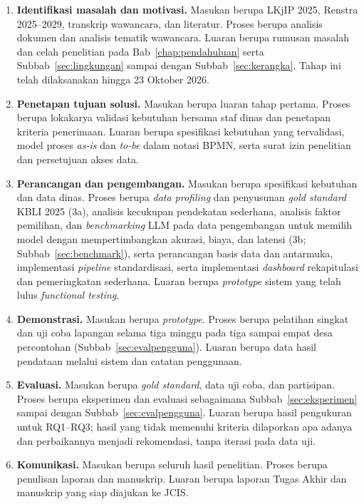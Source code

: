 \begin{enumerate}
  \item \textbf{Identifikasi masalah dan motivasi.} Masukan berupa LKjIP 2025, Renstra 2025--2029, transkrip wawancara, dan literatur. Proses berupa analisis dokumen dan analisis tematik wawancara. Luaran berupa rumusan masalah dan celah penelitian pada Bab~\ref{chap:pendahuluan} serta Subbab~\ref{sec:lingkungan} sampai dengan Subbab~\ref{sec:kerangka}. Tahap ini telah dilaksanakan hingga 23 Oktober 2026.
  \item \textbf{Penetapan tujuan solusi.} Masukan berupa luaran tahap pertama. Proses berupa lokakarya validasi kebutuhan bersama staf dinas dan penetapan kriteria penerimaan. Luaran berupa spesifikasi kebutuhan yang tervalidasi, model proses \textit{as-is} dan \textit{to-be} dalam notasi BPMN, serta surat izin penelitian dan persetujuan akses data.
  \item \textbf{Perancangan dan pengembangan.} Masukan berupa spesifikasi kebutuhan dan data dinas. Proses berupa \textit{data profiling} dan penyusunan \textit{gold standard} KBLI 2025 (3a), analisis kecukupan pendekatan sederhana, analisis faktor pemilihan, dan \textit{benchmarking} LLM pada data pengembangan untuk memilih model dengan mempertimbangkan akurasi, biaya, dan latensi (3b; Subbab~\ref{sec:benchmark}), serta perancangan basis data dan antarmuka, implementasi \textit{pipeline} standardisasi, serta implementasi \textit{dashboard} rekapitulasi dan pemeringkatan sederhana. Luaran berupa \textit{prototype} sistem yang telah lulus \textit{functional testing}.
  \item \textbf{Demonstrasi.} Masukan berupa \textit{prototype}. Proses berupa pelatihan singkat dan uji coba lapangan selama tiga minggu pada tiga sampai empat desa percontohan (Subbab~\ref{sec:evalpengguna}). Luaran berupa data hasil pendataan melalui sistem dan catatan penggunaan.
  \item \textbf{Evaluasi.} Masukan berupa \textit{gold standard}, data uji coba, dan partisipan. Proses berupa eksperimen dan evaluasi sebagaimana Subbab~\ref{sec:eksperimen} sampai dengan Subbab~\ref{sec:evalpengguna}. Luaran berupa hasil pengukuran untuk RQ1--RQ3; hasil yang tidak memenuhi kriteria dilaporkan apa adanya dan perbaikannya menjadi rekomendasi, tanpa iterasi pada data uji.
  \item \textbf{Komunikasi.} Masukan berupa seluruh hasil penelitian. Proses berupa penulisan laporan dan manuskrip. Luaran berupa laporan Tugas Akhir dan manuskrip yang siap diajukan ke JCIS.
\end{enumerate}

